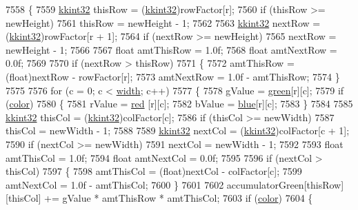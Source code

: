 \begin{DoxyCode}
7558   \{
7559     \hyperlink{namespace_k_k_b_a8fa4952cc84fda1de4bec1fbdd8d5b1b}{kkint32}  thisRow = (\hyperlink{namespace_k_k_b_a8fa4952cc84fda1de4bec1fbdd8d5b1b}{kkint32})rowFactor[r];
7560     \textcolor{keywordflow}{if}  (thisRow >= newHeight)
7561       thisRow = newHeight - 1;
7562 
7563     \hyperlink{namespace_k_k_b_a8fa4952cc84fda1de4bec1fbdd8d5b1b}{kkint32}  nextRow = (\hyperlink{namespace_k_k_b_a8fa4952cc84fda1de4bec1fbdd8d5b1b}{kkint32})rowFactor[r + 1];
7564     \textcolor{keywordflow}{if}  (nextRow >= newHeight)
7565       nextRow = newHeight - 1;
7566 
7567     \textcolor{keywordtype}{float}  amtThisRow = 1.0f;
7568     \textcolor{keywordtype}{float}  amtNextRow = 0.0f;
7569 
7570     \textcolor{keywordflow}{if}  (nextRow > thisRow)
7571     \{
7572       amtThisRow = (float)nextRow - rowFactor[r];
7573       amtNextRow = 1.0f - amtThisRow;
7574     \}
7575 
7576     \textcolor{keywordflow}{for}  (c = 0;  c < \hyperlink{class_k_k_b_1_1_raster_ae0bcc103e191c3421d7692dc69ceb554}{width};  c++)
7577     \{
7578       gValue = \hyperlink{class_k_k_b_1_1_raster_a2d2238911145488e226cd2e34fc8448c}{green}[r][c];
7579       \textcolor{keywordflow}{if}  (\hyperlink{class_k_k_b_1_1_raster_a482384d89cc53fa4f36276307c746854}{color})
7580       \{
7581         rValue = \hyperlink{class_k_k_b_1_1_raster_a7fd39e0463c8477d0d0d26e11126d285}{red} [r][c];
7582         bValue = \hyperlink{class_k_k_b_1_1_raster_a0265be7ea30f5b1f9d6310a79bee868b}{blue}[r][c];
7583       \}
7584 
7585       \hyperlink{namespace_k_k_b_a8fa4952cc84fda1de4bec1fbdd8d5b1b}{kkint32}  thisCol = (\hyperlink{namespace_k_k_b_a8fa4952cc84fda1de4bec1fbdd8d5b1b}{kkint32})colFactor[c];
7586       \textcolor{keywordflow}{if}  (thisCol >= newWidth)
7587         thisCol = newWidth - 1;
7588 
7589       \hyperlink{namespace_k_k_b_a8fa4952cc84fda1de4bec1fbdd8d5b1b}{kkint32}  nextCol = (\hyperlink{namespace_k_k_b_a8fa4952cc84fda1de4bec1fbdd8d5b1b}{kkint32})colFactor[c + 1];
7590       \textcolor{keywordflow}{if}  (nextCol >= newWidth)
7591         nextCol = newWidth - 1;
7592 
7593       \textcolor{keywordtype}{float}  amtThisCol = 1.0f;
7594       \textcolor{keywordtype}{float}  amtNextCol = 0.0f;
7595 
7596       \textcolor{keywordflow}{if}  (nextCol > thisCol)
7597       \{
7598         amtThisCol = (float)nextCol - colFactor[c];
7599         amtNextCol = 1.0f - amtThisCol;
7600       \}
7601 
7602       accumulatorGreen[thisRow][thisCol] += gValue * amtThisRow * amtThisCol;
7603       \textcolor{keywordflow}{if}  (\hyperlink{class_k_k_b_1_1_raster_a482384d89cc53fa4f36276307c746854}{color})
7604       \{

\end{DoxyCode}
